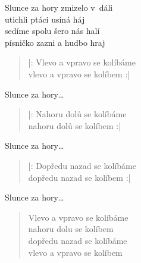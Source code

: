 \begin{song}{}
\begin{refren}
   Slunce za hory zmizelo v~dáli  \\
   utichli ptáci usíná háj  \\
   sedíme spolu šero nás halí  \\
   písničko zazni a hudbo hraj 
\end{refren}
\begin{verse}
   |: Vlevo a vpravo se kolíbáme  \\
   vlevo a vpravo se kolíbem :|
\end{verse}
\begin{refren}
   Slunce za hory\ldots
\end{refren}
\begin{verse}
   |: Nahoru dolů se kolíbáme  \\
   nahoru dolů se kolíbem :| 
\end{verse}
\begin{refren}
   Slunce za hory\ldots
\end{refren}
\begin{verse}
   |: Dopředu nazad se kolíbáme  \\
   dopředu nazad se kolíbem :|
\end{verse}
\begin{refren}
   Slunce za hory\ldots
\end{refren}
\begin{verse}
   Vlevo a vpravo se kolíbáme  \\
   nahoru dolu se kolíbem  \\
   dopředu nazad se kolíbáme  \\
   vlevo a vpravo se kolíbem 
\end{verse}
\end{song}
\pagebreak

